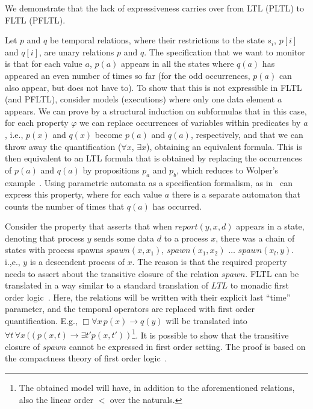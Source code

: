 

We demonstrate that the lack of expressiveness
carries over from LTL (PLTL) to FLTL (PFLTL).

\vspace{1ex}
Let $p$ and $q$ be temporal relations, where their
restrictions to the state $s_i$, $p[i]$ and $q[i]$, are unary relations $p$ and $q$. The
specification that we want to monitor is that for each value
$a$, $p(a)$ appears in all the states where $q(a)$ has appeared an even number of times so far (for the odd occurrences, $p(a)$ can also appear, but does not have to). To show that this is not expressible in FLTL (and PFLTL),
consider models (executions) where only one data element $a$ appears. We can prove by a structural induction on subformulas
that in this case, for each property $\varphi$
we can replace occurrences of variables within
predicates by $a$, i.e., $p(x)$ and $q(x)$ become $p(a)$
and $q  (a )$, respectively, and that we can throw away
the quantification ($\forall x$, $\exists x$), obtaining
an equivalent formula. This is then equivalent to
an LTL formula that is obtained by replacing
the occurrences of $p(a)$ and $q(a)$ by propositions
$p_a$ and $p_b$, which reduces to Wolper's example~\cite{Wolper}.
Using parametric automata as a specification formalism, as in~\cite{Grum,havelund-rv-data-2018,Meredith2011,Reger2015} can express this property, 
where for each value $a$ there is a separate automaton that counts the number of times that $q(a)$ has occurred.

\vspace{1ex}
Consider the property that asserts that when
$\mathit{report}(y , x, d)$ appears
in a state, denoting that  process 
$y$ sends some data $d$ to a process $x$,
there was a chain of states with process spawns
$\mathit{spawn}(x, x_1)$, $\mathit{spawn} (x_1, x_2)$ $\ldots$
$\mathit{spawn}(x_l , y)$. i.,e., $y$ is a descendent process of $x$. The reason
is that the required property needs to
assert about the transitive closure
of the relation $\mathit{spawn}$. 
FLTL can be translated in a way similar to a standard translation of $LTL$ to monadic first order logic~\cite{Thomas}. Here, the relations will be written with their explicit last ``time'' parameter, and the temporal operators are replaced with first order quantification.
E.g., $\Box \forall x \, p(x) \rightarrow q(y)$ will be translated into $\forall t \, \forall x \, ((p(x, t) \rightarrow \exists t' p(x, t') )$\footnote{The obtained model will have, in addition
to the aforementioned relations, also
the linear order $<$ over the naturals.}.
It is possible to show that the transitive closure of $\mathit{spawn}$ cannot be expressed in first order setting. The proof is based on the
compactness theory of first order logic~\cite{Flum}.

